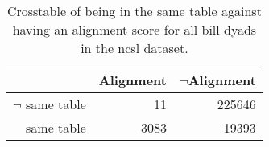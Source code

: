 \begin{table}[ht]
\centering
\begin{tabular}{rrr}
  \hline
 & Alignment & $\neg$Alignment \\ 
  \hline
$\neg$ same table &  11 & 225646 \\ 
 same table & 3083 & 19393 \\ 
   \hline
\end{tabular}
\caption{Crosstable of being in the same table against having
an alignment score for all bill dyads in the ncsl dataset.} 
\label{tab:ncsl_crosstab}
\end{table}
